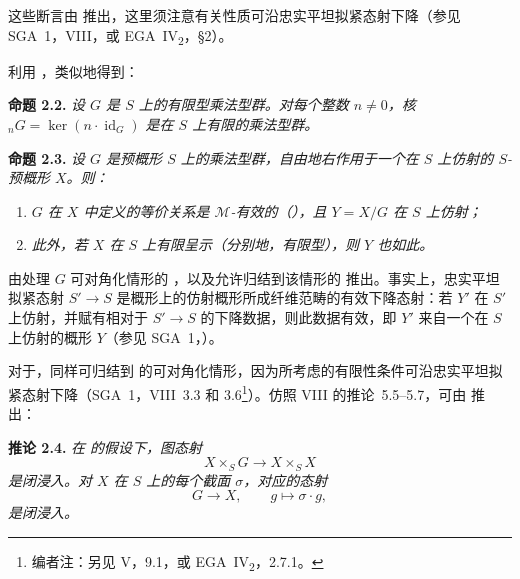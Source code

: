 这些断言由  推出，这里须注意有关性质可沿忠实平坦拟紧态射下降（参见 SGA~1，VIII，或 EGA~IV\textsubscript{2}，\S2）。

利用 ，类似地得到：

\medskip
\noindent{}\textbf{命题 2.2.}
\textit{设 \(G\) 是 \(S\) 上的有限型乘法型群。对每个整数 \(n\ne0\)，核 \({}_nG=\ker(n\cdot\operatorname{id}_G)\) 是在 \(S\) 上有限的乘法型群。}

\medskip
\noindent{}\textbf{命题 2.3.}
\textit{设 \(G\) 是预概形 \(S\) 上的乘法型群，自由地右作用于一个在 \(S\) 上仿射的 \(S\)-预概形 \(X\)。则：}
\begin{enumerate}
  \item[(a)]
  \textit{\(G\) 在 \(X\) 中定义的等价关系是 \(\mathcal M\)-有效的（），且 \(Y=X/G\) 在 \(S\) 上仿射；}

  \item[(b)]
  \textit{此外，若 \(X\) 在 \(S\) 上有限呈示（分别地，有限型），则 \(Y\) 也如此。}
\end{enumerate}

 由处理 \(G\) 可对角化情形的 ，以及允许归结到该情形的  推出。事实上，忠实平坦拟紧态射 \(S'\to S\) 是概形上的仿射概形所成纤维范畴的有效下降态射：若 \(Y'\) 在 \(S'\) 上仿射，并赋有相对于 \(S'\to S\) 的下降数据，则此数据有效，即 \(Y'\) 来自一个在 \(S\) 上仿射的概形 \(Y\)（参见 SGA~1，）。

对于，同样可归结到  的可对角化情形，因为所考虑的有限性条件可沿忠实平坦拟紧态射下降（SGA~1，VIII~3.3 和 3.6\footnote{编者注：另见 V，9.1，或 EGA~IV\textsubscript{2}，2.7.1。}）。仿照 VIII 的推论~5.5--5.7，可由  推出：

\medskip
\noindent{}\textbf{推论 2.4.}
\textit{在  的假设下，图态射}
\[
  X\times_S G\longrightarrow X\times_S X
\]
\textit{是闭浸入。对 \(X\) 在 \(S\) 上的每个截面 \(\sigma\)，对应的态射}
\[
  G\longrightarrow X,\qquad g\longmapsto\sigma\cdot g,
\]
\textit{是闭浸入。}

